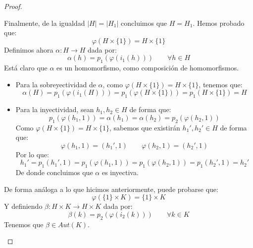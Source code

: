 \begin{teo}
\begin{proof}
\begin{enumerate}
                Finalmente, de la igualdad $|H| = |H_1|$ concluimos que $H = H_1$. Hemos probado que:
                \begin{equation*}
                    \varphi(H\times \{1\}) = H\times \{1\}
                \end{equation*}
                Definimos ahora $\alpha:H\to H$ dada por:
                \begin{equation*}
                    \alpha(h) = p_1(\varphi(i_1(h))) \qquad \forall h\in H
                \end{equation*}
                Está claro que $\alpha$ es un homomorfismo, como composición de homomorfismos.
                \begin{itemize}
                    \item Para la sobreyectividad de $\alpha$, como $\varphi(H\times \{1\}) = H\times \{1\}$, tenemos que:
                        \begin{equation*}
                            \alpha(H) = p_1(\varphi(i_1(H))) = p_1(\varphi(H\times \{1\})) = p_1(H\times \{1\}) = H
                        \end{equation*}
                    \item Para la inyectividad, sean $h_1,h_2\in H$ de forma que:
                        \begin{equation*}
                            p_1(\varphi(h_1,1)) = \alpha(h_1) = \alpha(h_2) = p_2(\varphi(h_2,1))
                        \end{equation*}
                        Como $\varphi(H\times \{1\}) = H\times \{1\}$, sabemos que existirán $h_1',h_2'\in H$ de forma que:
                        \begin{equation*}
                            \varphi(h_1, 1) = (h_1', 1) \qquad \varphi(h_2,1) = (h_2',1)
                        \end{equation*}
                        Por lo que:
                        \begin{equation*}
                            h_1' = p_1(h_1', 1) = p_1(\varphi(h_1,1)) = p_1(\varphi(h_2,1)) = p_1(h_2', 1) = h_2'
                        \end{equation*}
                        De donde concluimos que $\alpha$ es inyectiva.
                \end{itemize}
                De forma análoga a lo que hicimos anteriormente, puede probarse que:
                \begin{equation*}
                    \varphi(\{1\}\times K) = \{1\}\times K
                \end{equation*}
                Y definiendo $\beta:H\times K\to H\times K$ dada por:
                \begin{equation*}
                    \beta(k) = p_2(\varphi(i_2(k))) \qquad \forall k\in K
                \end{equation*}
                Tenemos que $\beta\in Aut(K)$.\\


\end{enumerate}
\end{proof}
\end{teo}
